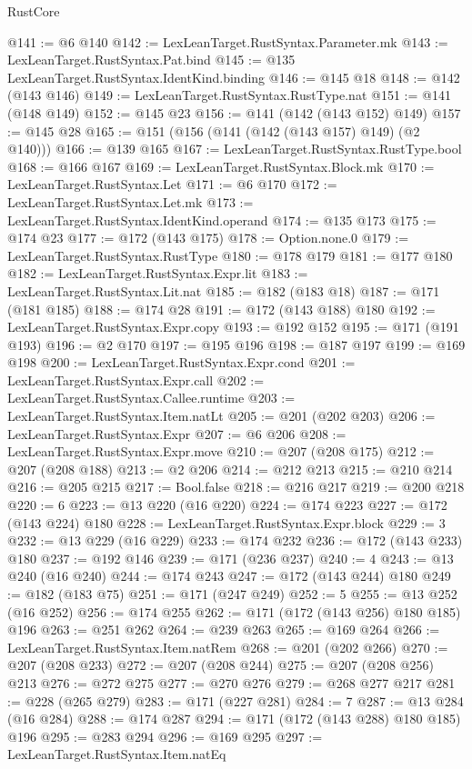 \begin{lexlean}{RustCore}
\begin{coremodule}
@141 := @6 @140
@142 := LexLeanTarget.RustSyntax.Parameter.mk
@143 := LexLeanTarget.RustSyntax.Pat.bind
@145 := @135 LexLeanTarget.RustSyntax.IdentKind.binding
@146 := @145 @18
@148 := @142 (@143 @146)
@149 := LexLeanTarget.RustSyntax.RustType.nat
@151 := @141 (@148 @149)
@152 := @145 @23
@156 := @141 (@142 (@143 @152) @149)
@157 := @145 @28
@165 := @151 (@156 (@141 (@142 (@143 @157) @149) (@2 @140)))
@166 := @139 @165
@167 := LexLeanTarget.RustSyntax.RustType.bool
@168 := @166 @167
@169 := LexLeanTarget.RustSyntax.Block.mk
@170 := LexLeanTarget.RustSyntax.Let
@171 := @6 @170
@172 := LexLeanTarget.RustSyntax.Let.mk
@173 := LexLeanTarget.RustSyntax.IdentKind.operand
@174 := @135 @173
@175 := @174 @23
@177 := @172 (@143 @175)
@178 := Option.none.{0}
@179 := LexLeanTarget.RustSyntax.RustType
@180 := @178 @179
@181 := @177 @180
@182 := LexLeanTarget.RustSyntax.Expr.lit
@183 := LexLeanTarget.RustSyntax.Lit.nat
@185 := @182 (@183 @18)
@187 := @171 (@181 @185)
@188 := @174 @28
@191 := @172 (@143 @188) @180
@192 := LexLeanTarget.RustSyntax.Expr.copy
@193 := @192 @152
@195 := @171 (@191 @193)
@196 := @2 @170
@197 := @195 @196
@198 := @187 @197
@199 := @169 @198
@200 := LexLeanTarget.RustSyntax.Expr.cond
@201 := LexLeanTarget.RustSyntax.Expr.call
@202 := LexLeanTarget.RustSyntax.Callee.runtime
@203 := LexLeanTarget.RustSyntax.Item.natLt
@205 := @201 (@202 @203)
@206 := LexLeanTarget.RustSyntax.Expr
@207 := @6 @206
@208 := LexLeanTarget.RustSyntax.Expr.move
@210 := @207 (@208 @175)
@212 := @207 (@208 @188)
@213 := @2 @206
@214 := @212 @213
@215 := @210 @214
@216 := @205 @215
@217 := Bool.false
@218 := @216 @217
@219 := @200 @218
@220 := 6
@223 := @13 @220 (@16 @220)
@224 := @174 @223
@227 := @172 (@143 @224) @180
@228 := LexLeanTarget.RustSyntax.Expr.block
@229 := 3
@232 := @13 @229 (@16 @229)
@233 := @174 @232
@236 := @172 (@143 @233) @180
@237 := @192 @146
@239 := @171 (@236 @237)
@240 := 4
@243 := @13 @240 (@16 @240)
@244 := @174 @243
@247 := @172 (@143 @244) @180
@249 := @182 (@183 @75)
@251 := @171 (@247 @249)
@252 := 5
@255 := @13 @252 (@16 @252)
@256 := @174 @255
@262 := @171 (@172 (@143 @256) @180 @185) @196
@263 := @251 @262
@264 := @239 @263
@265 := @169 @264
@266 := LexLeanTarget.RustSyntax.Item.natRem
@268 := @201 (@202 @266)
@270 := @207 (@208 @233)
@272 := @207 (@208 @244)
@275 := @207 (@208 @256) @213
@276 := @272 @275
@277 := @270 @276
@279 := @268 @277 @217
@281 := @228 (@265 @279)
@283 := @171 (@227 @281)
@284 := 7
@287 := @13 @284 (@16 @284)
@288 := @174 @287
@294 := @171 (@172 (@143 @288) @180 @185) @196
@295 := @283 @294
@296 := @169 @295
@297 := LexLeanTarget.RustSyntax.Item.natEq

\end{coremodule}
\end{lexlean}
